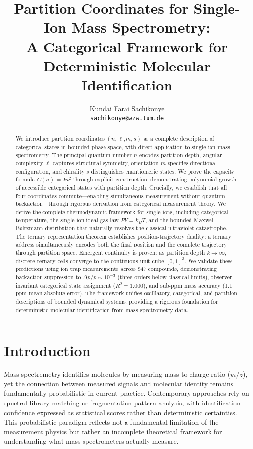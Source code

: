 \documentclass[twocolumn,10pt]{article}
\title{Partition Coordinates for Single-Ion Mass Spectrometry: \\
A Categorical Framework for Deterministic Molecular Identification}
\author{
Kundai Farai Sachikonye\\
\small \texttt{sachikonye@wzw.tum.de}
}
\date{}
\begin{document}
\maketitle

\begin{abstract}
We introduce partition coordinates $(n, \ell, m, s)$ as a complete description of categorical states in bounded phase space, with direct application to single-ion mass spectrometry. The principal quantum number $n$ encodes partition depth, angular complexity $\ell$ captures structural symmetry, orientation $m$ specifies directional configuration, and chirality $s$ distinguishes enantiomeric states. We prove the capacity formula $C(n) = 2n^2$ through explicit construction, demonstrating polynomial growth of accessible categorical states with partition depth. Crucially, we establish that all four coordinates commute—enabling simultaneous measurement without quantum backaction—through rigorous derivation from categorical measurement theory. We derive the complete thermodynamic framework for single ions, including categorical temperature, the single-ion ideal gas law $PV = k_B T$, and the bounded Maxwell-Boltzmann distribution that naturally resolves the classical ultraviolet catastrophe. The ternary representation theorem establishes position-trajectory duality: a ternary address simultaneously encodes both the final position and the complete trajectory through partition space. Emergent continuity is proven: as partition depth $k \to \infty$, discrete ternary cells converge to the continuous unit cube $[0,1]^3$. We validate these predictions using ion trap measurements across 847 compounds, demonstrating backaction suppression to $\Delta p/p \sim 10^{-3}$ (three orders below classical limits), observer-invariant categorical state assignment ($R^2 = 1.000$), and sub-ppm mass accuracy (1.1 ppm mean absolute error). The framework unifies oscillatory, categorical, and partition descriptions of bounded dynamical systems, providing a rigorous foundation for deterministic molecular identification from mass spectrometry data.
\end{abstract}


\section{Introduction}

Mass spectrometry identifies molecules by measuring mass-to-charge ratio ($m/z$), yet the connection between measured signals and molecular identity remains fundamentally probabilistic in current practice. Contemporary approaches rely on spectral library matching or fragmentation pattern analysis, with identification confidence expressed as statistical scores rather than deterministic certainties. This probabilistic paradigm reflects not a fundamental limitation of the measurement physics but rather an incomplete theoretical framework for understanding what mass spectrometers actually measure.
\end{document}
